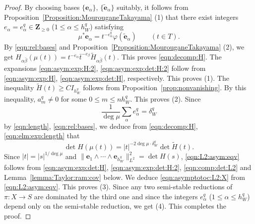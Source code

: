 \documentclass[amscd, leqno]{amsart}
\theoremstyle{plain}
\theoremstyle{definition}
\theoremstyle{remark}
\newenvironment{pf}{\begin{proof}}{\end{proof}}
\begin{document}
\begin{pf}
By choosing bases $\{ {\mathbf e}_{\alpha} \}$, $\{ \widetilde{\mathbf e}_{\alpha} \}$ suitably, 
it follows from Proposition~\ref{Proposition:MourouganeTakayama} (1) that there exist integers 
$e_{\alpha} = e^{q}_{\alpha} \in {\mathbf Z}_{\geq0}$ ($1\leq\alpha\leq h_{W}^{q}$) satisfying
\begin{equation}
\label{eqn:rel:bases}
\mu^{*}{\mathbf e}_{\alpha} = t^{-e^{q}_{\alpha}}\varphi( \widetilde{\mathbf e}_{\alpha} )
\qquad
(t \in T).
\end{equation}
By \eqref{eqn:rel:bases} and Proposition~\ref{Proposition:MourouganeTakayama} (2), we get
$H_{\alpha\bar{\beta}}(\mu(t)) = t^{-e_{\alpha}}\bar{t}^{-e_{\beta}} \widetilde{H}_{\alpha\bar{\beta}}(t)$.
This proves \eqref{eqn:decomp:H}. The expansions \eqref{eqn:asym:exp:H:2}, \eqref{eqn:asym:exp:det:H:2} follow from
\eqref{eqn:asym:exp:H}, \eqref{eqn:asym:exp:det:H}, respectively. This proves (1).
The inequality $\widetilde{H}(t) \geq C I_{h_{W}^{q}}$ follows from Proposition~\ref{prop:nonvanishing}. 
By this inequality, $a_{m}^{q}\not=0$ for some $0 \leq m \leq n h_{W}^{q}$.
This proves (2). Since
\begin{equation}
\label{eqn:elm:exp:length}
\frac{1}{\deg \mu} \sum_{\alpha} e^{q}_{\alpha} = \delta_{W}^{q}
\end{equation}
by \eqref{eqn:length}, \eqref{eqn:rel:bases}, we deduce from \eqref{eqn:decomp:H}, \eqref{eqn:elm:exp:length} that
\begin{equation}
\label{eqn:comp:det:L2}
\det H(\mu(t)) = |t|^{-2\deg \mu\cdot \delta_{W}^{q}} \det \widetilde{H}(t).
\end{equation}
Since $|t|=|s|^{1/\deg \mu}$ and $\| {\mathbf e}_{1}\wedge \cdots\wedge {\mathbf e}_{h_{W}^{q}} \|_{L^{2}}^{2} = \det H(s)$, 
\eqref{eqn:L2:asym:eqv} follows from \eqref{eqn:asym:exp:det:H}, \eqref{eqn:asym:exp:det:H:2}, \eqref{eqn:comp:det:L2} 
and Lemma~\ref{lemma:Taylor:ram:cov} below. 
We deduce \eqref{eqn:asymptotoc:L2:X} from \eqref{eqn:L2:asym:eqv}. This proves (3).
Since any two semi-stable reductions of $\pi \colon X \to S$ are dominated by the third one and since the integers $e^{q}_{\alpha}$ 
($1\leq \alpha \leq h_{W}^{q}$) depend only on the semi-stable reduction, we get (4). This completes the proof.
\end{pf}
\end{document}
